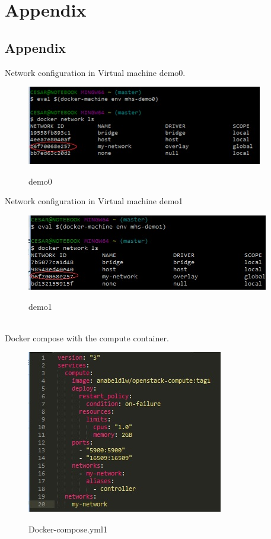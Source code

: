
\chapter{Appendix}



\section{Appendix}

Network configuration in Virtual machine demo0.

\begin{figure}[bth]
{\includegraphics[width=1\linewidth]{gfx/demo0}}\caption[demo0]{demo0}
\label{fig:demo0}
\end{figure}

Network configuration in Virtual machine demo1

\begin{figure}[bth]
{\includegraphics[width=0.7\linewidth]{gfx/demo1}}\caption[demo1]{demo1}
\label{fig:demo1}
\end{figure}
\\

Docker compose with the compute container.
\begin{figure}[bth]
{\includegraphics[width=0.6\linewidth]{gfx/compose}}\caption[Docker-compose.yml]{Docker-compose.yml1}
\label{fig:compose}
\end{figure}\\

